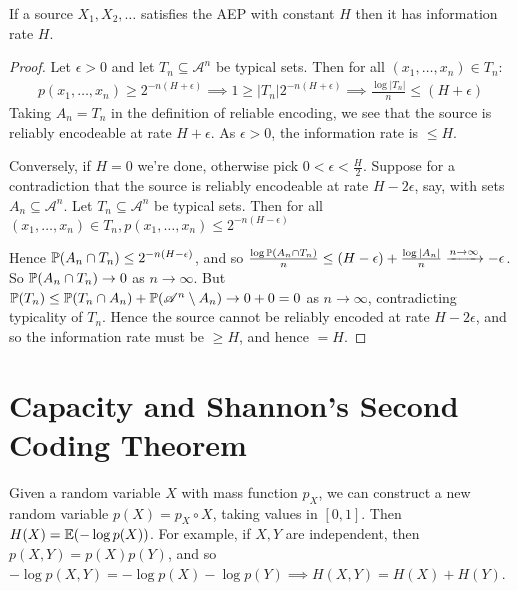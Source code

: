 \documentclass[10pt,a4paper]{article}
\begin{document}
\begin{theorem}
If a source $X_1, X_2, \ldots$ satisfies the AEP with constant $H$ then it has information rate $H$.
\end{theorem}
\begin{proof}
Let $\epsilon >0$ and let $T_n \subseteq \mathscr{A}^n$ be typical sets. Then for all $(x_1, \ldots, x_n) \in T_n$:
\begin{align*}
p(x_1, \ldots, x_n) \geq 2^{-n(H+\epsilon)} \implies 1 \geq |T_n|2^{-n(H+\epsilon)} \implies \frac{\log|T_n|}{n} \leq (H+\epsilon)
\end{align*}
Taking $A_n = T_n$ in the definition of reliable encoding, we see that the source is reliably encodeable at rate $H+\epsilon$. As $\epsilon >0$, the information rate is $\leq H$.

Conversely, if $H=0$ we're done, otherwise pick $0 <\epsilon < \frac{H}{2}$. Suppose for a contradiction that the source is reliably encodeable at rate $H-2\epsilon$, say, with sets $A_n \subseteq \mathscr{A}^n$. Let $T_n \subseteq \mathscr{A}^n$ be typical sets. Then for all $(x_1, \ldots, x_n) \in T_n, p(x_1, \ldots, x_n) \leq 2^{-n(H-\epsilon)}$

Hence $\P(A_n \cap T_n) \leq 2^{-n(H-\epsilon)}$, and so $\frac{\log\P(A_n\cap T_n)}{n} \leq (H-\epsilon) + \frac{\log |A_n|}{n}\xrightarrow{n \to \infty} -\epsilon$. So $\P(A_n \cap T_n) \to 0$ as $n \to \infty$. But $\P(T_n) \leq \P(T_n\cap A_n) + \P(\mathscr{A}^n \setminus A_n) \to 0 + 0 = 0$ as $n \to \infty$, contradicting typicality of $T_n$. Hence the source cannot be reliably encoded at rate $H-2\epsilon$, and so the information rate must be $\geq H$, and hence $=H$.
\end{proof}
\section{Capacity and Shannon's Second Coding Theorem}
Given a random variable $X$ with mass function $p_X$, we can construct a new random variable $p(X) = p_X \circ X$, taking values in $[0,1]$. Then $H(X) = \E(-\log p(X))$. For example, if $X,Y$ are independent, then $p(X,Y) = p(X)p(Y)$, and so $-\log p(X,Y) = -\log p(X) - \log p(Y) \implies H(X,Y) = H(X)+H(Y)$.
\end{document}
